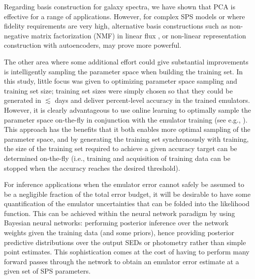 \documentclass[twocolumn]{aastex62}
\begin{document}
Regarding basis construction for galaxy spectra, we have shown that PCA is effective for a range of applications. However, for complex SPS models or where fidelity requirements are very high, alternative basis constructions such as non-negative matrix factorization (NMF) in linear flux \citep{hurley2014,lovell2019}, or non-linear representation construction with autoencoders, may prove more powerful.

The other area where some additional effort could give substantial improvements is intelligently sampling the parameter space when building the training set. In this study, little focus was given to optimizing parameter space sampling and training set size; training set sizes were simply chosen so that they could be generated in $\lesssim$ days and deliver percent-level accuracy in the trained emulators. However, it is clearly advantageous to use online learning to optimally sample the parameter space on-the-fly in conjunction with the emulator training (see e.g., \citealp{rogers2019,alsing2019}). This approach has the benefits that it both enables more optimal sampling of the parameter space, and by generating the training set synchronously with training, the size of the training set required to achieve a given accuracy target can be determined on-the-fly (i.e., training and acquisition of training data can be stopped when the accuracy reaches the desired threshold).

For inference applications when the emulator error cannot safely be assumed to be a negligible fraction of the total error budget, it will be desirable to have some quantification of the emulator uncertainties that can be folded into the likelihood function. This can be achieved within the neural network paradigm by using Bayesian neural networks: performing posterior inference over the network weights given the training data (and some priors), hence providing posterior predictive distributions over the output SEDs or photometry rather than simple point estimates. This sophistication comes at the cost of having to perform many forward passes through the network to obtain an emulator error estimate at a given set of SPS parameters.
\end{document}

